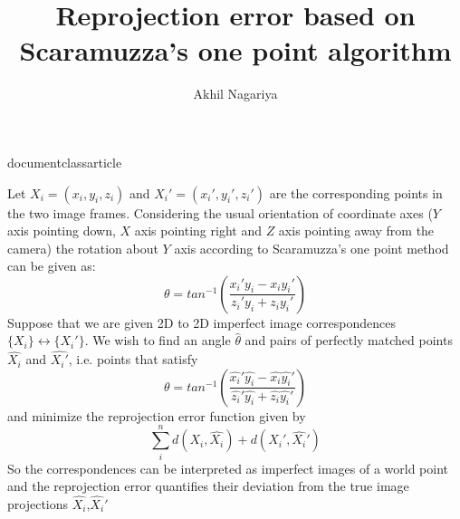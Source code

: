documentclass{article}

\title{Reprojection error based on Scaramuzza's one point algorithm} 
\author{Akhil Nagariya}

\maketitle
Let $X_i=(x_i,y_i,z_i)$ and $X_i'=(x_i',y_i',z_i')$ are the corresponding points in the two image frames. Considering the usual orientation of coordinate axes ($Y$ axis pointing down, $X$ axis pointing right and $Z$ axis pointing away from the camera) the rotation about $Y$ axis according to Scaramuzza's one point method can be given as:
 \begin{equation}
 \theta = tan^{-1}\left(\frac{x_i'y_i-x_iy_i'}{z_i'y_i+z_iy_i'}\right)
 \end{equation}
 Suppose that we are given 2D to 2D imperfect image correspondences $\{X_i\} \leftrightarrow \{X_i'\}$. We wish to find an angle $\hat{\theta}$ and pairs of perfectly matched points $\hat{X_i}$ and $\hat{X_i'}$, i.e. points that satisfy
 \begin{equation}
 \theta = tan^{-1}\left(\frac{\hat{x_i}'\hat{y_i}-\hat{x_i}\hat{y_i}'}{\hat{z_i}'\hat{y_i}+\hat{z_i}\hat{y_i}'}\right)
 \end{equation}
 and minimize the reprojection error function given by
 \begin{equation}
 \sum_i^n d(X_i,\hat{X_i}) + d(X_i',\hat{X_i}')
 \end{equation}
 So the correspondences can be interpreted as imperfect images of a world point and the reprojection error quantifies their deviation from the true image projections $\hat{X_i}$,$\hat{X_i}'$
